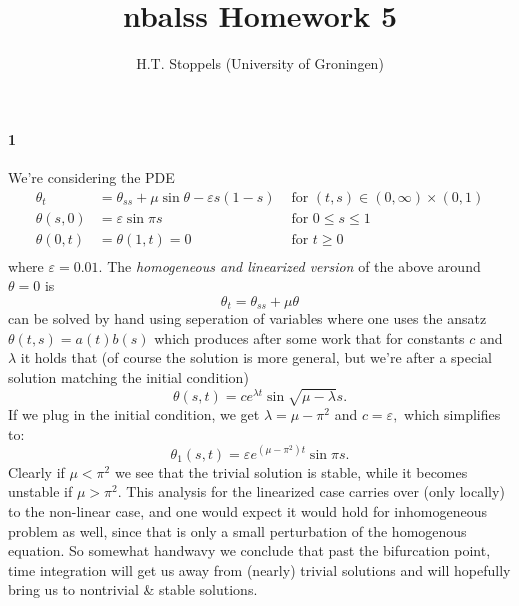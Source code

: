 \documentclass[a4paper]{article}
\author{H.T. Stoppels (University of Groningen)}
\title{{\sc nbalss} Homework 5}
\begin{document}
  \maketitle 

  \paragraph{1} We're considering the PDE
  \begin{equation}\label{eq:pde}
  \begin{aligned}
    \theta_t &= \theta_{ss} + \mu \sin \theta - \varepsilon s(1 - s) & \text{ for } (t, s) \in (0, \infty) \times (0, 1) \\
    \theta(s, 0) &= \varepsilon \sin \pi s & \text{ for } 0 \le s \le 1 \\
    \theta(0, t) &= \theta(1, t) = 0  & \text{ for } t \ge 0\\
  \end{aligned}
  \end{equation}
  where $\varepsilon = 0.01.$ The \emph{homogeneous and linearized version} of the above around $\theta = 0$ is $$\theta_t = \theta_{ss} + \mu \theta$$ can be solved by hand using seperation of variables where one uses the ansatz $\theta(t, s) = a(t)b(s)$ which produces after some work that for constants $c$ and $\lambda$ it holds that (of course the solution is more general, but we're after a special solution matching the initial condition) $$\theta(s, t) = c e^{\lambda t} \sin \sqrt{\mu - \lambda}s.$$ If we plug in the initial condition, we get $\lambda = \mu - \pi^2$ and $c = \varepsilon,$ which simplifies to: $$\theta_1(s,t) = \varepsilon e^{(\mu - \pi^2)t}\sin \pi s.$$ Clearly if $\mu < \pi^2$ we see that the trivial solution is stable, while it becomes unstable if $\mu > \pi^2.$ This analysis for the linearized case carries over (only locally) to the non-linear case, and one would expect it would hold for inhomogeneous problem as well, since that is only a small perturbation of the homogenous equation. So somewhat handwavy we conclude that past the bifurcation point, time integration will get us away from (nearly) trivial solutions and will hopefully bring us to nontrivial \& stable solutions.
\end{document}
